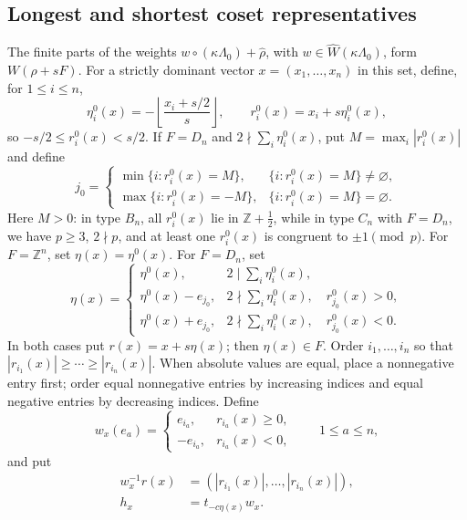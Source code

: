 \documentclass[11pt,a4paper]{amsart}
\newcommand{\ZZ}{\mathbb Z}
\theoremstyle{plain}
\numberwithin{equation}{section}
\begin{document}
\subsection{Longest and shortest coset representatives}
The finite parts of the weights
\(w\circ(\kappa\Lambda_0)+\widehat\rho\), with
\(w\in\widehat W(\kappa\Lambda_0)\), form \(W(\rho+sF)\).
For a strictly dominant vector \(x=(x_1,\ldots,x_n)\) in this set,
define, for \(1\le i\le n\),
\begin{equation}
\eta_i^0(x)=-\left\lfloor\frac{x_i+s/2}{s}\right\rfloor,
\qquad r_i^0(x)=x_i+s\eta_i^0(x),
\label{eq:A-residue}
\end{equation}
so \(-s/2\le r_i^0(x)<s/2\). If \(F=D_n\) and
\(2\nmid\sum_i\eta_i^0(x)\), put
\(M=\max_i|r_i^0(x)|\) and define
\begin{equation}
j_0=
\begin{cases}
\min\{i:r_i^0(x)=M\},&\{i:r_i^0(x)=M\}\ne\varnothing,\\[1mm]
\max\{i:r_i^0(x)=-M\},&\{i:r_i^0(x)=M\}=\varnothing.
\end{cases}
\label{eq:A-j0}
\end{equation}
Here \(M>0\): in type \(B_n\), all \(r_i^0(x)\) lie in
\(\ZZ+\tfrac12\), while in type \(C_n\) with \(F=D_n\), we have
\(p\ge3\), \(2\nmid p\), and at least one \(r_i^0(x)\) is
congruent to \(\pm1\pmod p\).
For \(F=\ZZ^n\), set \(\eta(x)=\eta^0(x)\). For \(F=D_n\), set
\begin{equation}
\eta(x)=
\begin{cases}
\eta^0(x),&\displaystyle2\mid\sum_i\eta_i^0(x),\\[1mm]
\eta^0(x)-e_{j_0},&\displaystyle2\nmid\sum_i\eta_i^0(x),
\quad r_{j_0}^0(x)>0,\\[1mm]
\eta^0(x)+e_{j_0},&\displaystyle2\nmid\sum_i\eta_i^0(x),
\quad r_{j_0}^0(x)<0.
\end{cases}
\label{eq:A-modification}
\end{equation}
In both cases put \(r(x)=x+s\eta(x)\); then \(\eta(x)\in F\).
Order \(i_1,\ldots,i_n\) so that
\(|r_{i_1}(x)|\ge\cdots\ge|r_{i_n}(x)|\).
When absolute values are equal, place a nonnegative entry first;
order equal nonnegative entries by increasing indices and equal
negative entries by decreasing indices.
Define
\begin{equation}
w_x(e_a)=
\begin{cases}
e_{i_a},&r_{i_a}(x)\ge0,\\
-e_{i_a},&r_{i_a}(x)<0,
\end{cases}
\qquad 1\le a\le n,
\label{eq:A-wx}
\end{equation}
and put
\begin{equation}
\begin{aligned}
w_x^{-1}r(x)&
=(|r_{i_1}(x)|,\ldots,|r_{i_n}(x)|),\\
h_x&=t_{-c\eta(x)}w_x.
\end{aligned}
\label{eq:A-wx-hx}
\end{equation}
\end{document}
